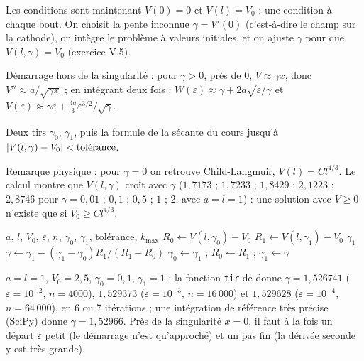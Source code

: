 \Pourquoi Les conditions sont maintenant $V(0) = 0$ et $V(l) = V_0$ : une
condition à chaque bout. On choisit la pente inconnue $\gamma = V'(0)$
(c'est-à-dire le champ sur la cathode), on intègre le problème à valeurs
initiales, et on ajuste $\gamma$ pour que $V(l, \gamma) = V_0$ (exercice V.5).

 Démarrage hors de la singularité : pour $\gamma > 0$, près de $0$,
$V \approx \gamma x$, donc $V'' \approx a/\sqrt{\gamma x}$ ; en intégrant deux
fois : $W(\varepsilon) \approx \gamma + 2a\sqrt{\varepsilon/\gamma}$ et
$V(\varepsilon) \approx \gamma\varepsilon + \frac{4a}{3}\varepsilon^{3/2}/\sqrt\gamma$.

 Deux tirs $\gamma_0$, $\gamma_1$, puis la formule de la sécante du cours
jusqu'à $\left|V(l, \gamma) - V_0\right| < \text{tolérance}$.

 Remarque physique : pour $\gamma = 0$ on retrouve Child-Langmuir,
$V(l) = Cl^{4/3}$. Le calcul montre que $V(l, \gamma)$ croît avec $\gamma$
($1{,}7173$ ; $1{,}7233$ ; $1{,}8429$ ; $2{,}1223$ ; $2{,}8746$ pour
$\gamma = 0{,}01$ ; $0{,}1$ ; $0{,}5$ ; $1$ ; $2$, avec $a = l = 1$) : une solution
avec $V \ge 0$ n'existe que si $V_0 \ge Cl^{4/3}$.

\begin{algo}[ : tir pour $V(0) = 0$, $V(l) = V_0$]
  \Require $a$, $l$, $V_0$, $\varepsilon$, $n$, $\gamma_0$, $\gamma_1$, tolérance, $k_{\max}$
  \State $R_0 \leftarrow V(l, \gamma_0) - V_0$ 
    \State $R_1 \leftarrow V(l, \gamma_1) - V_0$
     \Print $\gamma_1$ \Stop \EndIf
    \State $\gamma \leftarrow \gamma_1 - (\gamma_1 - \gamma_0)R_1/(R_1 - R_0)$
    \State $\gamma_0 \leftarrow \gamma_1$ ; $R_0 \leftarrow R_1$ ; $\gamma_1 \leftarrow \gamma$
  \EndFor
\end{algo}

\Verif $a = l = 1$, $V_0 = 2{,}5$, $\gamma_0 = 0{,}1$, $\gamma_1 = 1$ : la fonction
\texttt{tir} de  donne $\gamma = 1{,}526741$
($\varepsilon = 10^{-2}$, $n = 4000$), $1{,}529373$ ($\varepsilon = 10^{-3}$,
$n = 16\,000$) et $1{,}529628$ ($\varepsilon = 10^{-4}$, $n = 64\,000$), en 6 ou
7 itérations ; une intégration de référence très précise (SciPy) donne
$\gamma = 1{,}52966$. Près de la singularité $x = 0$, il faut à la fois un
départ $\varepsilon$ petit (le démarrage n'est qu'approché) et un pas fin
(la dérivée seconde y est très grande).

